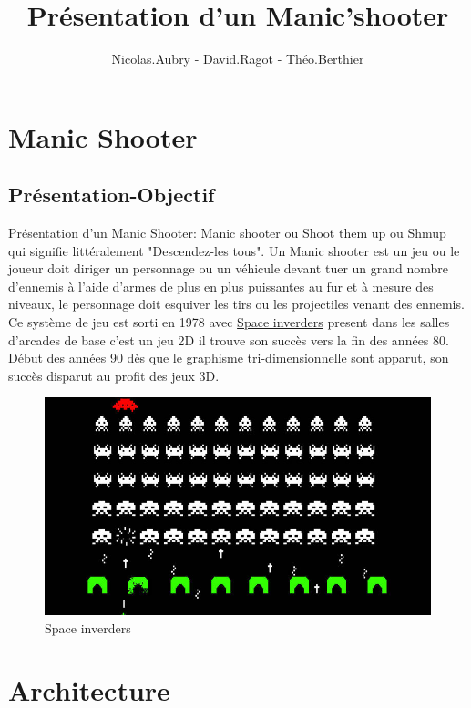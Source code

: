 \documentclass[a4paper, 11pt]{article}
\title{Présentation d'un Manic'shooter}
\author{Nicolas.Aubry - David.Ragot - Théo.Berthier}
\begin{document}
\maketitle
\tableofcontents
\section{Manic Shooter}
\subsection{Présentation-Objectif}

Présentation d'un Manic Shooter:
Manic shooter ou Shoot them up ou Shmup qui signifie littéralement "Descendez-les tous".
Un Manic shooter est un jeu ou le joueur doit diriger un personnage ou un véhicule devant tuer un grand nombre d'ennemis à l'aide d'armes de plus en plus puissantes au fur et à mesure des niveaux, le personnage doit esquiver les tirs ou les projectiles venant des ennemis.
Ce système de jeu est sorti en 1978 avec 
\href{http://dictionnaire.sensagent.leparisien.fr/Space%20Invaders/fr-fr/}{Space inverders}
 present dans les salles d'arcades de base c'est un jeu 2D il trouve son succès vers la fin des années 80. Début des années 90 dès que le graphisme tri-dimensionnelle sont apparut, son succès disparut au profit des jeux 3D.

 \begin{figure}[ht!]
 \centering
 \includegraphics[width=0.7\linewidth]{space.jpg}
 \caption{Space inverders}
 \label{fig::example::one}
\end{figure}

\section{Architecture}
\end{document}
